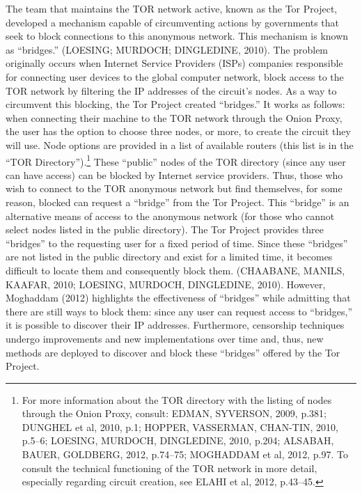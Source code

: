 The team that maintains the TOR network active, known as the Tor Project, developed a mechanism capable of circumventing actions by governments that seek to block connections to this anonymous network. This mechanism is known as ``bridges.'' (LOESING; MURDOCH; DINGLEDINE, 2010). The problem originally occurs when Internet Service Providers (ISPs) companies responsible for connecting user devices to the global computer network, block access to the TOR network by filtering the IP addresses of the circuit's nodes. As a way to circumvent this blocking, the Tor Project created ``bridges.'' It works as follows: when connecting their machine to the TOR network through the Onion Proxy, the user has the option to choose three nodes, or more, to create the circuit they will use. Node options are provided in a list of available routers (this list is in the ``TOR Directory'').\footnote{For more information about the TOR directory with the listing of nodes through the Onion Proxy, consult: EDMAN, SYVERSON, 2009, p.381; DUNGHEL et al, 2010, p.1; HOPPER, VASSERMAN, CHAN-TIN, 2010, p.5--6; LOESING, MURDOCH, DINGLEDINE, 2010, p.204; ALSABAH, BAUER, GOLDBERG, 2012, p.74--75; MOGHADDAM et al, 2012, p.97. To consult the technical functioning of the TOR network in more detail, especially regarding circuit creation, see ELAHI et al, 2012, p.43--45.} These ``public'' nodes of the TOR directory (since any user can have access) can be blocked by Internet service providers. Thus, those who wish to connect to the TOR anonymous network but find themselves, for some reason, blocked can request a ``bridge'' from the Tor Project. This ``bridge'' is an alternative means of access to the anonymous network (for those who cannot select nodes listed in the public directory). The Tor Project provides three ``bridges'' to the requesting user for a fixed period of time. Since these ``bridges'' are not listed in the public directory and exist for a limited time, it becomes difficult to locate them and consequently block them. (CHAABANE, MANILS, KAAFAR, 2010; LOESING, MURDOCH, DINGLEDINE, 2010). However, Moghaddam (2012) highlights the effectiveness of ``bridges'' while admitting that there are still ways to block them: since any user can request access to ``bridges,'' it is possible to discover their IP addresses. Furthermore, censorship techniques undergo improvements and new implementations over time and, thus, new methods are deployed to discover and block these ``bridges'' offered by the Tor Project.

